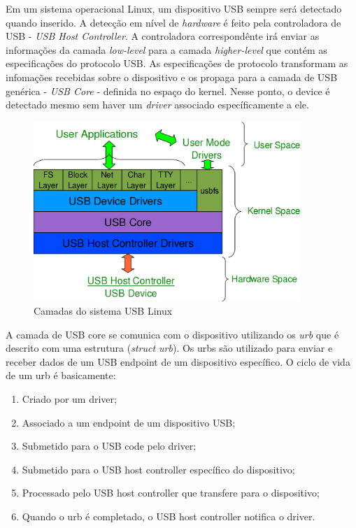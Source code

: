 Em um sistema operacional Linux, um dispositivo USB sempre será detectado quando inserido.
A detecção em nível de \textit{hardware} é feito pela controladora de USB - \textit{USB Host Controller}. A controladora
correspondênte irá enviar as informações da camada \textit{low-level} para a camada \textit{higher-level} que contém
as especificações do protocolo USB. As especificações de protocolo transformam as infomações recebidas
sobre o dispositivo e os propaga para a camada de USB genérica - \textit{USB Core} - definida no espaço
do kernel. Nesse ponto, o device é detectado mesmo sem haver um \textit{driver} associado específicamente a ele.

\begin{figure}[H]
  \centering
  \caption{Camadas do sistema USB Linux}
  \label{fig:usblinux}
  \includegraphics[width=0.9\textwidth]{figure/usbgeral.eps}
\end{figure}

A camada de USB core se comunica com o dispositivo utilizando os \textit{urb} que é descrito com uma estrutura
(\textit{struct urb}). Os urbs são utilizado para enviar e receber dados de um USB endpoint de um
dispositivo específico. O ciclo de vida de um urb é basicamente:
\begin{enumerate}
  \item Criado por um driver;
  \item Associado a um endpoint de um dispositivo USB;
  \item Submetido para o USB code pelo driver;
  \item Submetido para o USB host controller específico do dispositivo;
  \item Processado pelo USB host controller que transfere para o dispositivo;
  \item Quando o urb é completado, o USB host controller notifica o driver.
\end{enumerate}

